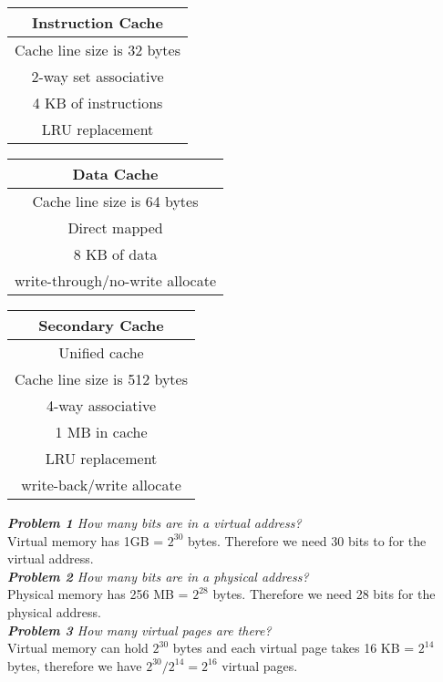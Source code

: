 \documentclass[12pt]{article}
\theoremstyle{remark}
\begin{document}
\begin{table}[H]
	\footnotesize
	\begin{tabular}[t]{|c|}
		\multicolumn{1}{c}{\bf Instruction Cache} \\ \hline
		Cache line size is 32 bytes \\ 
		2-way set associative \\
		4 KB of instructions \\ 
		LRU replacement \\ \hline  
	\end{tabular}
	\hfill
	\begin{tabular}[t]{|c|}
		\multicolumn{1}{c}{\bf Data Cache} \\ \hline
		Cache line size is 64 bytes \\ 
		Direct mapped \\
		8 KB of data \\ 
		write-through/no-write allocate \\ \hline  
	\end{tabular}
	\hfill
	\begin{tabular}[t]{|c|}
		\multicolumn{1}{c}{\bf Secondary Cache} \\ \hline
		Unified cache \\ 
		Cache line size is 512 bytes \\ 
		4-way associative \\
		1 MB in cache \\
		LRU replacement \\ 
		write-back/write allocate \\ \hline
	\end{tabular} 
\end{table}

\textit{\textbf{Problem 1} How many bits are in a virtual address?} \\

Virtual memory has 1GB = $2^{30}$ bytes. Therefore we need 30 bits to for the virtual address. \\

\textit{\textbf{Problem 2} How many bits are in a physical address?} \\

Physical memory has 256 MB = $2^{28}$ bytes. Therefore we need 28 bits for the physical address. \\

\textit{\textbf{Problem 3} How many virtual pages are there?} \\ 

Virtual memory can hold $2^{30}$ bytes and each virtual page takes 16 KB = $2^{14}$ bytes, therefore we have $2^{30}/2^{14} = 2^{16}$ virtual pages. \\ 
\end{document}
